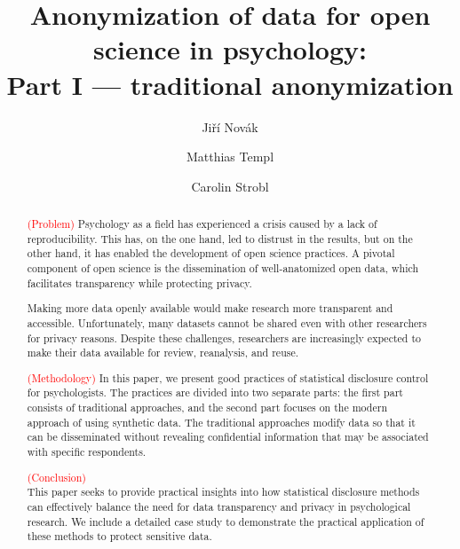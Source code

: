 \documentclass{article}
\title{Anonymization of data for open science in psychology: \\ 
       Part I — traditional anonymization
}
\author{Jiří Novák \and 
        Matthias Templ \and 
        Carolin Strobl
        }
\begin{document}
\maketitle

\begin{abstract}
\textcolor{red}{(Problem)} 
Psychology as a field has experienced a crisis caused by a lack of reproducibility. 
This has, on the one hand, led to distrust in the results, but on the other hand, it has enabled the development of open science practices. 
A pivotal component of open science is the dissemination of well-anatomized open data, which facilitates transparency while protecting privacy.

Making more data openly available would make research more transparent and accessible. Unfortunately, many datasets cannot be shared even with other researchers for privacy reasons. 
Despite these challenges, researchers are increasingly expected to make their data available for review, reanalysis, and reuse.

\textcolor{red}{(Methodology)} 
In this paper, we present good practices of statistical disclosure control for psychologists. 
The practices are divided into two separate parts: the first part consists of traditional approaches, and the second part focuses on the modern approach of using synthetic data.
The traditional approaches modify data so that it can be disseminated without revealing confidential information that may be associated with specific respondents. 

\textcolor{red}{(Conclusion)} \\ 
This paper seeks to provide practical insights into how statistical disclosure methods can effectively balance the need for data transparency and privacy in psychological research.
We include a detailed case study to demonstrate the practical application of these methods to protect sensitive data.

\end{abstract}


\end{document}
